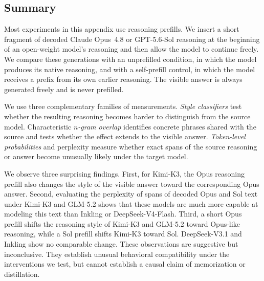 \subsection{Summary}

Most experiments in this appendix use reasoning prefills. We insert a short fragment of decoded Claude Opus~4.8 or GPT-5.6-Sol reasoning at the beginning of an open-weight model's reasoning and then allow the model to continue freely. We compare these generations with an unprefilled condition, in which the model produces its native reasoning, and with a self-prefill control, in which the model receives a prefix from its own earlier reasoning. The visible answer is always generated freely and is never prefilled. 

We use three complementary families of measurements. \textit{Style classifiers} test whether the resulting reasoning becomes harder to distinguish from the source model. Characteristic \textit{$n$-gram overlap} identifies concrete phrases shared with the source and tests whether the effect extends to the visible answer. \textit{Token-level probabilities} and perplexity measure whether exact spans of the source reasoning or answer become unusually likely under the target model.

We observe three surprising findings. First, for Kimi-K3, the Opus reasoning prefill also changes the style of the visible answer toward the corresponding Opus answer. Second, evaluating the perplexity of spans of decoded Opus and Sol text under Kimi-K3 and GLM-5.2 shows that these models are much more capable at modeling this text than Inkling or DeepSeek-V4-Flash. Third, a short Opus prefill shifts the reasoning style of Kimi-K3 and GLM-5.2 toward Opus-like reasoning, while a Sol prefill shifts Kimi-K3 toward Sol. DeepSeek-V3.1 and Inkling show no comparable change. These observations are suggestive but inconclusive. They establish unusual behavioral compatibility under the interventions we test, but cannot establish a causal claim of memorization or distillation.




